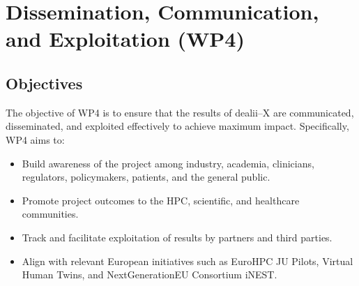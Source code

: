 \documentclass[a4paper,12pt, numbers]{article}
\begin{document}


\newpage

\section{{Dissemination, Communication, and Exploitation (WP4)}}
\label{sec:wp4_communication}

\subsection{Objectives}

The objective of WP4 is to ensure that the results of dealii--X are communicated, disseminated, and exploited effectively to achieve maximum impact. Specifically, WP4 aims to:
\begin{itemize}[left=1em, itemsep=0pt, topsep=0pt] 
\item Build awareness of the project among industry, academia, clinicians, regulators, policymakers, patients, and the general public.
\item Promote project outcomes to the HPC, scientific, and healthcare communities.
\item Track and facilitate exploitation of results by partners and third parties.
\item Align with relevant European initiatives such as EuroHPC JU Pilots, Virtual Human Twins, and NextGenerationEU Consortium iNEST.
\end{itemize}
\end{document}
